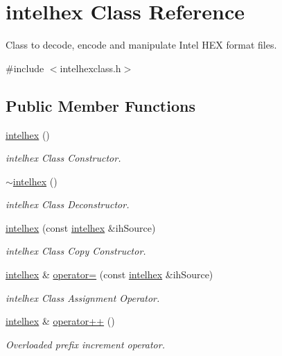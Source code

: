 \hypertarget{classintelhex}{\section{intelhex Class Reference}
\label{classintelhex}
}


Class to decode, encode and manipulate Intel H\-E\-X format files.  




{\ttfamily \#include $<$intelhexclass.\-h$>$}

\subsection*{Public Member Functions}
\begin{DoxyCompactItemize}
\item 
\hyperlink{classintelhex_ae1efd0ed1f56546f8f5f5af87c6cbdd5}{intelhex} ()
\begin{DoxyCompactList}\small\item\em intelhex Class Constructor. \end{DoxyCompactList}\item 
\hyperlink{classintelhex_a031ce4582899f5263fdcc2fa92cc3e45}{$\sim$intelhex} ()
\begin{DoxyCompactList}\small\item\em intelhex Class Deconstructor. \end{DoxyCompactList}\item 
\hyperlink{classintelhex_a41b4c3b7851461b9240fdef90bc62768}{intelhex} (const \hyperlink{classintelhex}{intelhex} \&ih\-Source)
\begin{DoxyCompactList}\small\item\em intelhex Class Copy Constructor. \end{DoxyCompactList}\item 
\hyperlink{classintelhex}{intelhex} \& \hyperlink{classintelhex_a6408cc3141862454e846378abfad8ecc}{operator=} (const \hyperlink{classintelhex}{intelhex} \&ih\-Source)
\begin{DoxyCompactList}\small\item\em intelhex Class Assignment Operator. \end{DoxyCompactList}\item 
\hyperlink{classintelhex}{intelhex} \& \hyperlink{classintelhex_a044d6ab5b10a38ffa40a0b1f55b7e808}{operator++} ()
\begin{DoxyCompactList}\small\item\em Overloaded prefix increment operator. \end{DoxyCompactList}\item 

\end{DoxyCompactItemize}
